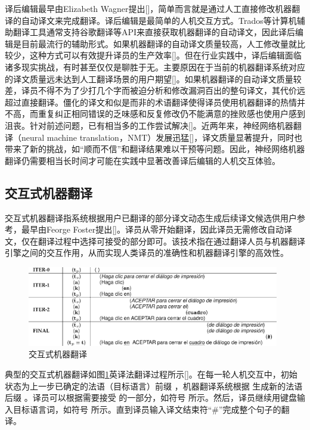 译后编辑最早由Elizabeth Wagner提出[\cite{Wagner:1985}]，简单而言就是通过人工直接修改机器翻译的自动译文来完成翻译。译后编辑是最简单的人机交互方式。Trados等计算机辅助翻译工具通常支持谷歌翻译等API来直接获取机器翻译的自动译文，因此译后编辑是目前最流行的辅助形式。如果机器翻译的自动译文质量较高，人工修改量就比较少，这种方式可以有效提升译员的生产效率[\cite{Car:2011,Koehn:2012,Zhechev:2012}]。但在行业实践中，译后编辑面临诸多现实挑战，有时甚至仅仅是聊胜于无。主要原因在于当前的机器翻译系统对应的译文质量远未达到人工翻译场景的用户期望[\cite{Thicke:2013,Moorkens:2015}]。如果机器翻译的自动译文质量较差，译员不得不为了少打几个字而被迫分析和修改漏洞百出的整句译文，其代价远超过直接翻译。僵化的译文和似是而非的术语翻译使得译员使用机器翻译的热情并不高，而重复纠正相同错误的乏味感和反复修改仍不能满意的挫败感也使用户感到沮丧。针对前述问题，已有相当多的工作尝试解决[\cite{Koehn:2009a,Simard:2013,Green:2014,Denkowski:2014,Wuebker:2015}]。近两年来，神经网络机器翻译（neural machine translation，NMT）发展迅猛[\cite{Zhang:2015,LiXiaoqing,TuZhaopeng:2016,Shen:2016}]，译文质量显著提升，同时也带来了新的挑战，如“顺而不信”和翻译结果难以干预等问题。因此，神经网络机器翻译仍需要相当长时间才可能在实践中显著改善译后编辑的人机交互体验。

\subsection{交互式机器翻译}

交互式机器翻译指系统根据用户已翻译的部分译文动态生成后续译文候选供用户参考，最早由Feorge Foster提出[\cite{Foster:2002}]。译员从零开始翻译，因此译员无需修改自动译文，仅在翻译过程中选择可接受的部分即可。该技术指在通过翻译人员与机器翻译引擎之间的交互作用，从而实现人类译员的准确性和机器翻译引擎的高效性。

\begin{figure}[!tb]
	\centering
	\includegraphics[width=0.98\textwidth]{Figure/Figure_2_9.png}
	\caption{交互式机器翻译}
	\label{Fig_imt_procedure}
\end{figure}

典型的交互式机器翻译如图\ref{Fig_imt_procedure}英译法翻译过程所示[\cite{Barrachina:2009}]。在每一轮人机交互中，初始状态为上一步已确定的法语（目标语言）前缀 ，机器翻译系统根据 生成新的法语后缀 。译员可以根据需要接受 的一部分，如符号 所示。然后，译员继续用键盘输入目标语言词，如符号 所示。直到译员输入译文结束符“\#”完成整个句子的翻译。

